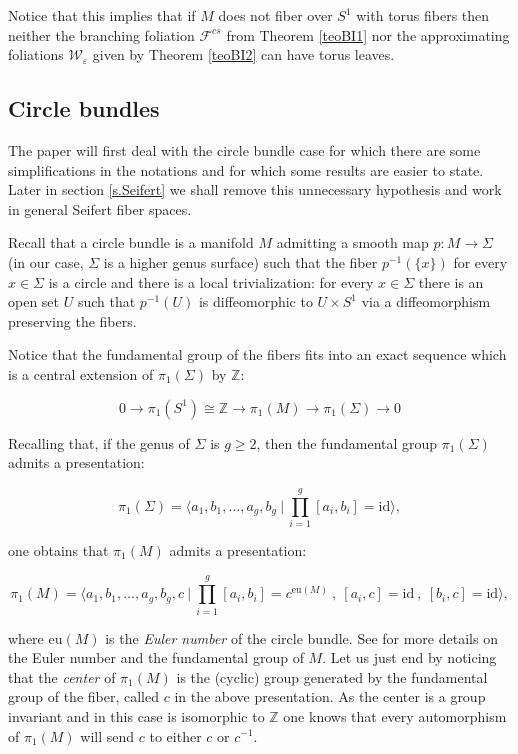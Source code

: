 \documentclass[11pt]{amsart} %
\newcommand{\cW}{\mathcal{W}}
\newcommand{\Fcs}{\mathcal{F}^{cs}}
\newcommand{\eps}{\varepsilon}
\numberwithin{equation}{section}
\theoremstyle{remark}
\begin{document}
Notice that this implies that if $M$ does not fiber over $S^1$ with torus fibers then neither the branching foliation $\Fcs$ from Theorem \ref{teoBI1} nor the approximating foliations $\cW_\eps$ given by Theorem \ref{teoBI2} can have torus leaves. 


\subsection{Circle bundles}\label{ss.circlebundles}
The paper will first deal with the circle bundle case for which there are some simplifications in the notations and for which some results are easier to state. Later in section \ref{s.Seifert} we shall remove this unnecessary hypothesis and work in general Seifert fiber spaces. 

Recall that a circle bundle is a manifold $M$ admitting a smooth map $p: M \to \Sigma$ (in our case, $\Sigma$ is a higher genus surface) such that the fiber $p^{-1}(\{x\})$ for every $x\in \Sigma$ is a circle and there is a local trivialization: for every $x\in \Sigma$ there is an open set $U$ such that $p^{-1}(U)$ is diffeomorphic to $U \times S^1$ via a diffeomorphism preserving the fibers.   

Notice that the fundamental group of the fibers fits into an exact sequence which is a central extension of $\pi_1(\Sigma)$ by $\mathbb{Z}$: 

$$ 0 \rightarrow \pi_1(S^1) \cong \mathbb{Z} \rightarrow  \pi_1(M) \rightarrow \pi_1(\Sigma) \rightarrow 0 $$

Recalling that, if the genus of $\Sigma$ is $g\geq 2$, then the fundamental group $\pi_1(\Sigma)$ admits a presentation: 

%


$$ \pi_1(\Sigma) = \bigg\langle a_1,b_1, \ldots, a_g, b_g  \  | \ \prod_{i=1}^g [a_i,b_i] = \mathrm{id} \bigg\rangle,  $$

\noindent one obtains that $\pi_1(M)$ admits a presentation:  

%

$$ \pi_1(M) = \bigg\langle a_1,b_1, \ldots, a_g, b_g, c \  | \  \prod_{i=1}^g [a_i,b_i] = c^{\mathrm{eu}(M)} \ , \ [a_i,c]= \mathrm{id} \ , \ [b_i,c]=\mathrm{id} \bigg\rangle,  $$

\noindent where $\mathrm{eu}(M)$ is the \emph{Euler number} of the circle bundle. See \cite[Book II, Chapter 4]{CandelConlon} for more details on the Euler number and the fundamental group of $M$. Let us just end by noticing that the \emph{center} of $\pi_1(M)$ is the (cyclic) group generated by the fundamental group of the fiber, called $c$ in the above presentation. As the center is a group invariant and in this case is isomorphic to $\mathbb{Z}$ one knows that every automorphism of $\pi_1(M)$ will send $c$ to either $c$ or $c^{-1}$. 
\end{document}
